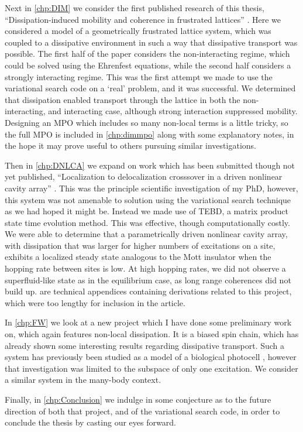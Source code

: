 Next in \cref{chp:DIM} we consider the first published research of this thesis, ``Dissipation-induced mobility and coherence in frustrated lattices'' \cite{Owen2017}. Here we considered a model of a geometrically frustrated lattice system, which was coupled to a dissipative environment in such a way that dissipative transport was possible. The first half of the paper considers the non-interacting regime, which could be solved using the Ehrenfest equations, while the second half considers a strongly interacting regime. This was the first attempt we made to use the variational search code on a `real' problem, and it was successful. We determined that dissipation enabled transport through the lattice in both the non-interacting, and interacting case, although strong interaction suppressed mobility. Designing an MPO which includes so many non-local terms is a little tricky, so the full MPO is included in \cref{chp:dimmpo} along with some explanatory notes, in the hope it may prove useful to others pursuing similar investigations.

Then in \cref{chp:DNLCA} we expand on work which has been submitted though not yet published, ``Localization to delocalization crosssover in a driven nonlinear cavity array'' \cite{Brown2018}. This was the principle scientific investigation of my PhD, however, this system was not amenable to solution using the variational search technique as we had hoped it might be. Instead we made use of TEBD, a matrix product state time evolution method. This was effective, though computationally costly. We were able to determine that a parametrically driven nonlinear cavity array, with dissipation that was larger for higher numbers of excitations on a site, exhibits a localized steady state analogous to the Mott insulator when the hopping rate between sites is low. At high hopping rates, we did not observe a superfluid-like state as in the equilibrium case, as long range coherences did not build up.  are technical appendices containing derivations related to this project, which were too lengthy for inclusion in the article.

In \cref{chp:FW} we look at a new project which I have done some preliminary work on, which again features non-local dissipation. It is a biased spin chain, which has already shown some interesting results regarding dissipative transport. Such a system has previously been studied as a model of a biological photocell \cite{Fruchtman2016}, however that investigation was limited to the subspace of only one excitation. We consider a similar system in the many-body context. 

Finally, in \cref{chp:Conclusion} we indulge in some conjecture as to the future direction of both that project, and of the variational search code, in order to conclude the thesis by casting our eyes forward. 